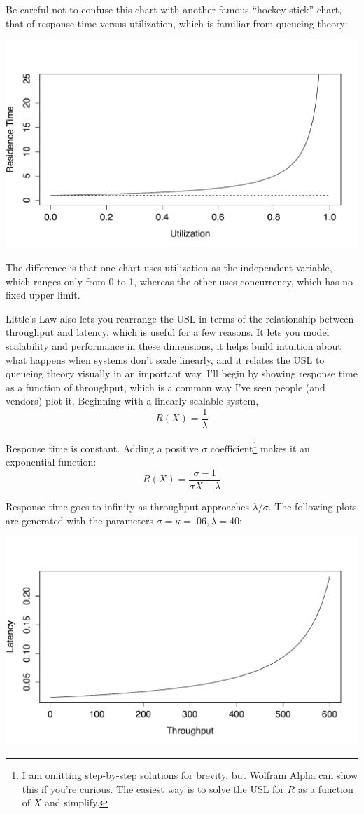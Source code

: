 \documentclass{vivid_layout}
\begin{document}
Be careful not to confuse this chart with another famous ``hockey stick'' chart,
that of response time versus utilization, which is familiar from queueing
theory:
\begin{center}
\includegraphics[width=.85\linewidth]{scalability/hockey}
\end{center}

The difference is that one chart uses utilization as the independent variable,
which ranges only from 0 to 1, whereas the other uses concurrency, which has no
fixed upper limit.

Little's Law also lets you rearrange the USL in terms of the relationship
between throughput and latency, which is useful for a few reasons. It lets you
model scalability and performance in these dimensions, it helps build intuition
about what happens when systems don't scale linearly,  and it relates the USL to
queueing theory visually in an important way.
I'll begin by showing response time as a function of throughput, which is a
common way I've seen people (and vendors) plot it. Beginning with a linearly
scalable system,
\[
R(X) = \frac{1}{\lambda}
\]

Response time is constant. Adding a positive $\sigma$ coefficient\footnote{I am
omitting step-by-step solutions for brevity, but Wolfram Alpha can show this if
you're curious. The easiest way is to solve the USL for $R$ as a function of
$X$ and simplify.} makes it an exponential function:
\begin{equation}
R(X) = \frac{\sigma - 1}{\sigma X - \lambda}
\label{amdahl_r_x}
\end{equation}

Response time goes to infinity as throughput approaches $\lambda/\sigma$. The
following plots are generated with the parameters $\sigma=\kappa=.06,
\lambda=40$:
\begin{center}
\includegraphics[width=.85\linewidth]{scalability/r-function-x-amdahl}
\end{center}
\end{document}
